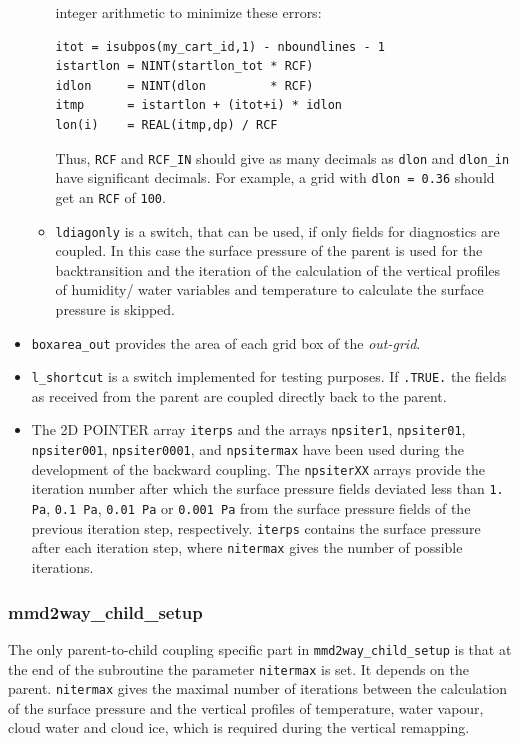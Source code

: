 \documentclass[11pt,twoside]{article}
\begin{document}
\begin{itemize}
\begin{itemize}
integer arithmetic to minimize these errors:
\begin{verbatim}
itot = isubpos(my_cart_id,1) - nboundlines - 1
istartlon = NINT(startlon_tot * RCF)
idlon     = NINT(dlon         * RCF)
itmp      = istartlon + (itot+i) * idlon
lon(i)    = REAL(itmp,dp) / RCF
\end{verbatim}
Thus, \verb|RCF| and \verb|RCF_IN| should give as many decimals
as \verb|dlon| and \verb|dlon_in| have significant decimals.
For example, a grid with \verb|dlon = 0.36| should get an \verb|RCF|
of \verb|100|. 
\item  \verb|ldiagonly| is a switch, that can be used, if only fields for
diagnostics are coupled. In this case the surface pressure of the parent
is used for the backtransition and the iteration of the calculation of
the vertical
profiles of humidity/ water variables and temperature to calculate the
surface pressure is skipped.
\end{itemize} %
\item \verb|boxarea_out| provides the area of each grid box of the {\it out-grid}.

\item \verb|l_shortcut| is a switch implemented for testing purposes. If 
\verb|.TRUE.| the fields as received from the parent are coupled directly back
to the parent.
\item The 2D {\footnotesize POINTER} array \verb|iterps| and the
arrays \verb|npsiter1|, \verb|npsiter01|, \verb|npsiter001|,
 \verb|npsiter0001|, and \verb|npsitermax| have been used during the development 
of the backward coupling. The \verb|npsiterXX| arrays provide the iteration
 number after which the surface pressure fields deviated less
 than \verb|1. Pa|, \verb|0.1 Pa|, \verb|0.01 Pa| or \verb|0.001 Pa| from the
 surface pressure fields of the previous iteration step,
 respectively. \verb|iterps| contains the surface pressure after each
 iteration step, where \verb|nitermax| gives the number of possible iterations.

\end{itemize}
\subsubsection{mmd2way\_child\_setup}
The only parent-to-child coupling specific part in \verb|mmd2way_child_setup|
is that at the end of the subroutine the parameter \verb|nitermax| is set. It 
depends on the parent. \verb|nitermax| gives the maximal number of
iterations  
between the calculation of the surface pressure and the vertical profiles of 
 temperature, water vapour, cloud
water and cloud ice, which is required during the vertical remapping.
\end{document}
